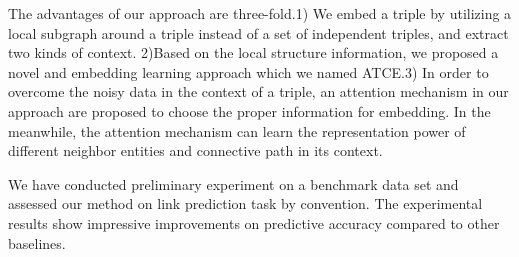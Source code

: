 The advantages of our approach are three-fold.1) We embed a triple by utilizing a local subgraph around a triple instead of a set of independent triples, and extract two kinds of context. 2)Based on the local structure information, we proposed a novel and embedding learning approach which we named ATCE.3) In order to overcome the noisy data in the context of a triple, an attention mechanism in our approach are proposed to choose the proper information for embedding. In the meanwhile, the attention mechanism can learn the representation power of different neighbor entities and connective path in its context.   

We have conducted preliminary experiment on a benchmark data set and assessed our method on link prediction task by convention. The experimental results show impressive improvements on predictive accuracy compared to other baselines.

